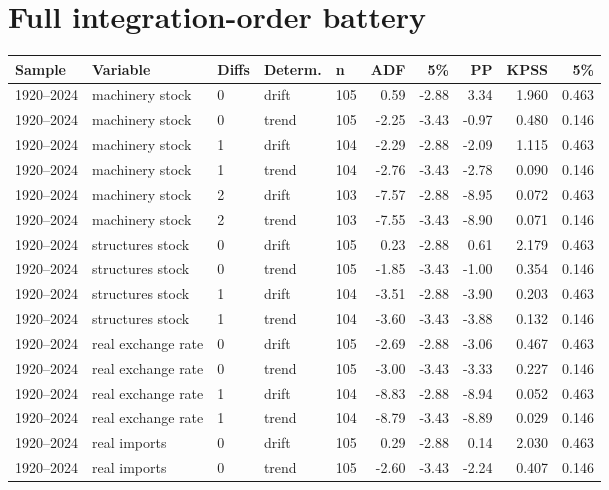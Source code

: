 \documentclass[11pt]{article}
\begin{document}
\FloatBarrier
\appendix
\section{Full integration-order battery}

\footnotesize
\begin{longtable}{p{1.6cm}p{3.4cm}p{0.6cm}p{1.1cm}p{0.6cm}rrrrr}
\toprule
\textbf{Sample} & \textbf{Variable} & \textbf{Diffs} & \textbf{Determ.} & \textbf{n} & \textbf{ADF} & \textbf{5\%} & \textbf{PP} & \textbf{KPSS} & \textbf{5\%} \\
\midrule
\endhead
1920--2024 & machinery stock & 0 & drift & 105 & 0.59 & -2.88 & 3.34 & 1.960 & 0.463 \\
1920--2024 & machinery stock & 0 & trend & 105 & -2.25 & -3.43 & -0.97 & 0.480 & 0.146 \\
1920--2024 & machinery stock & 1 & drift & 104 & -2.29 & -2.88 & -2.09 & 1.115 & 0.463 \\
1920--2024 & machinery stock & 1 & trend & 104 & -2.76 & -3.43 & -2.78 & 0.090 & 0.146 \\
1920--2024 & machinery stock & 2 & drift & 103 & -7.57 & -2.88 & -8.95 & 0.072 & 0.463 \\
1920--2024 & machinery stock & 2 & trend & 103 & -7.55 & -3.43 & -8.90 & 0.071 & 0.146 \\
1920--2024 & structures stock & 0 & drift & 105 & 0.23 & -2.88 & 0.61 & 2.179 & 0.463 \\
1920--2024 & structures stock & 0 & trend & 105 & -1.85 & -3.43 & -1.00 & 0.354 & 0.146 \\
1920--2024 & structures stock & 1 & drift & 104 & -3.51 & -2.88 & -3.90 & 0.203 & 0.463 \\
1920--2024 & structures stock & 1 & trend & 104 & -3.60 & -3.43 & -3.88 & 0.132 & 0.146 \\
1920--2024 & real exchange rate & 0 & drift & 105 & -2.69 & -2.88 & -3.06 & 0.467 & 0.463 \\
1920--2024 & real exchange rate & 0 & trend & 105 & -3.00 & -3.43 & -3.33 & 0.227 & 0.146 \\
1920--2024 & real exchange rate & 1 & drift & 104 & -8.83 & -2.88 & -8.94 & 0.052 & 0.463 \\
1920--2024 & real exchange rate & 1 & trend & 104 & -8.79 & -3.43 & -8.89 & 0.029 & 0.146 \\
1920--2024 & real imports & 0 & drift & 105 & 0.29 & -2.88 & 0.14 & 2.030 & 0.463 \\
1920--2024 & real imports & 0 & trend & 105 & -2.60 & -3.43 & -2.24 & 0.407 & 0.146 \\

\end{longtable}
\end{document}
